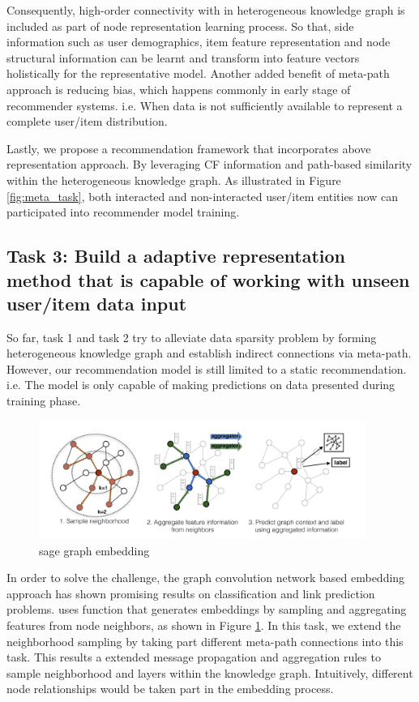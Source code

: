 Consequently, high-order connectivity with in heterogeneous knowledge graph is included as part of node representation learning process. So that, side information such as user demographics, item feature representation and node structural information can be learnt and transform into feature vectors holistically for the representative model.
Another added benefit of meta-path approach is reducing bias, which happens commonly in early stage of recommender systems. i.e. When data is not sufficiently available to represent a complete user/item distribution.

Lastly, we propose a recommendation framework that incorporates above representation approach. By leveraging CF information and path-based similarity within the heterogeneous knowledge graph. As illustrated in Figure \ref{fig:meta_task}, both interacted and non-interacted user/item entities now can participated into recommender model training.

\subsection*{Task 3: Build a adaptive representation method that is capable of working with unseen user/item data input}

So far, task 1 and task 2 try to alleviate data sparsity problem by forming heterogeneous knowledge graph and establish indirect connections via meta-path. However, our recommendation model is still limited to a static recommendation. i.e. The model is only capable of making predictions on data presented during training phase.

\begin{figure}[!ht]
    \centering
    \includegraphics[width=0.95\textwidth]{figs/sagegraph.png}
    \caption{sage graph embedding}\label{fig:sagegraph}
\end{figure}

In order to solve the challenge, the graph convolution network based embedding approach has shown promising results on classification and link prediction problems. \citet{hamilton2017inductive} uses function that generates embeddings by sampling and aggregating features from node neighbors, as shown in Figure \ref{fig:sagegraph}. In this task, we extend the neighborhood sampling by taking part different meta-path connections into this task. This results a extended message propagation and aggregation rules to sample neighborhood and layers within the knowledge graph. Intuitively, different node relationships would be taken part in the embedding process.

